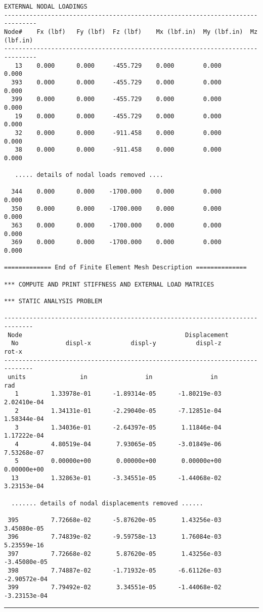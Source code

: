 \begin{footnotesize}
\begin{verbatim}
EXTERNAL NODAL LOADINGS 
-------------------------------------------------------------------------------
Node#    Fx (lbf)   Fy (lbf)  Fz (lbf)    Mx (lbf.in)  My (lbf.in)  Mz (lbf.in)
-------------------------------------------------------------------------------
   13    0.000      0.000     -455.729    0.000        0.000        0.000
  393    0.000      0.000     -455.729    0.000        0.000        0.000
  399    0.000      0.000     -455.729    0.000        0.000        0.000
   19    0.000      0.000     -455.729    0.000        0.000        0.000
   32    0.000      0.000     -911.458    0.000        0.000        0.000
   38    0.000      0.000     -911.458    0.000        0.000        0.000

   ..... details of nodal loads removed ....

  344    0.000      0.000    -1700.000    0.000        0.000        0.000
  350    0.000      0.000    -1700.000    0.000        0.000        0.000
  363    0.000      0.000    -1700.000    0.000        0.000        0.000
  369    0.000      0.000    -1700.000    0.000        0.000        0.000

============= End of Finite Element Mesh Description ==============

*** COMPUTE AND PRINT STIFFNESS AND EXTERNAL LOAD MATRICES 

*** STATIC ANALYSIS PROBLEM 

------------------------------------------------------------------------------
 Node                                             Displacement
  No             displ-x           displ-y           displ-z             rot-x 
------------------------------------------------------------------------------
 units               in                in                in               rad 
   1         1.33978e-01      -1.89314e-05      -1.80219e-03       2.02410e-04
   2         1.34131e-01      -2.29040e-05      -7.12851e-04       1.58344e-04
   3         1.34036e-01      -2.64397e-05       1.11846e-04       1.17222e-04
   4         4.80519e-04       7.93065e-05      -3.01849e-06       7.53268e-07
   5         0.00000e+00       0.00000e+00       0.00000e+00       0.00000e+00
  13         1.32863e-01      -3.34551e-05      -1.44068e-02       3.23153e-04

  ....... details of nodal displacements removed ......

 395         7.72668e-02      -5.87620e-05       1.43256e-03       3.45080e-05
 396         7.74839e-02      -9.59758e-13       1.76084e-03       5.23559e-16
 397         7.72668e-02       5.87620e-05       1.43256e-03      -3.45080e-05
 398         7.74887e-02      -1.71932e-05      -6.61126e-03      -2.90572e-04
 399         7.79492e-02       3.34551e-05      -1.44068e-02      -3.23153e-04
\end{verbatim}
\rule{6.25 in}{0.035 in}
\end{footnotesize}

